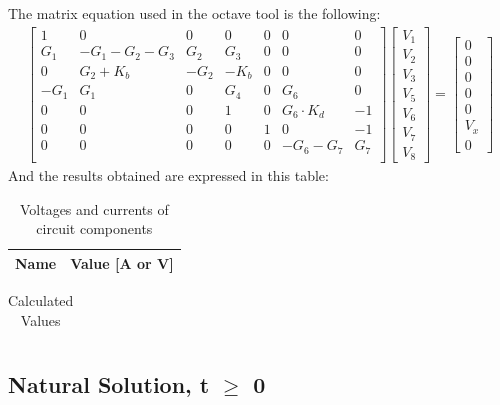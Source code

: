 The matrix equation used in the octave tool is the following:
\begin{gather}
	\begin{bmatrix}
		1 & 0 & 0 & 0 & 0 & 0 & 0 \\
		G_1 & -G_1 - G_2 - G_3 & G_2 & G_3 & 0 & 0 & 0 \\
		0 & G_2 + K_b & -G_2 & -K_b & 0 & 0 & 0 \\
		-G_1 & G_1 & 0 & G_4 & 0 & G_6 & 0 \\
		0 & 0 & 0 & 1 & 0 & G_6\cdot K_d & -1 \\
		0 & 0 & 0 & 0 & 1 & 0 & -1 \\
		0 & 0 & 0 & 0 & 0 & -G_6-G_7 & G_7 \\
	\end{bmatrix}
	\begin {bmatrix} V_1 \\ V_2 \\ V_3 \\ V_5  \\ V_6 \\ V_7 \\ V_8 \end{bmatrix}
	=
	\begin {bmatrix} 0  \\ 0  \\ 0  \\ 0 \\ 0  \\ V_x \\ 0 \end{bmatrix}
\end{gather}
And the results obtained are expressed in this table:
\begin{table}[H]
  \centering
  \begin{tabular}{|l|r|}
    \hline    
    {\bf Name} & {\bf Value [A or V]} \\ \hline
    
  \end{tabular}
  \caption{Voltages and currents of circuit components}
  \label{tab:val21}
\end{table}

\begin{table}[H]
  \centering
  \begin{tabular}{|l|r|}
    \hline    
    
  \end{tabular}
  \caption{Calculated Values}
  \label{tab:val22}
\end{table}

\subsection{Natural Solution, t $\ge$ 0}

